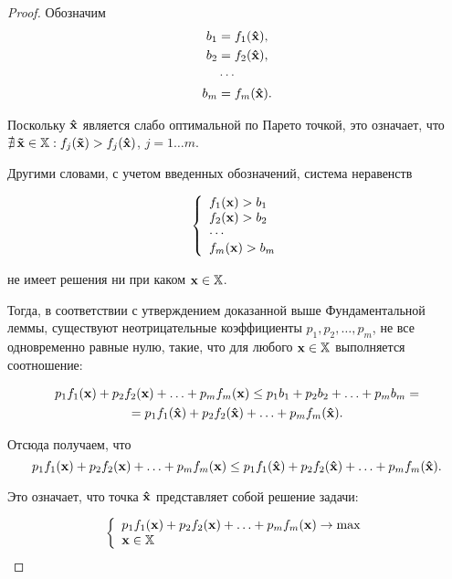 \begin{proof}

Обозначим
\begin{align*}
 b_1 &=f_1(\mathbf{\hat x}),\\
 b_2 &=f_2(\mathbf{\hat x}),\\
  &\cdots \\
 b_m &=f_m(\mathbf{\hat x}).
\end{align*}

Поскольку $\mathbf{\hat x}$ является слабо оптимальной по Парето точкой,
это означает, что $\nexists \, \mathbf{\tilde x} \in \mathbb{X}:
f_j(\mathbf{\tilde x})> f_j(\mathbf{\hat x})$, $j=1 \ldots m$.

Другими словами, с учетом введенных обозначений, система неравенств

\[
\left\{ \begin{array}{l}
 f_1(\mathbf{x}) > b_1\\
 f_2(\mathbf{x}) > b_2 \\
  \cdots  \\
 f_m(\mathbf{x}) > b_m \\
 \end{array} \right.
\]

\noindent не имеет решения ни при каком $\mathbf{x} \in \mathbb{X}$.

Тогда, в соответствии с утверждением доказанной выше Фундаментальной
леммы, существуют неотрицательные коэффициенты $p_1, p_2, \ldots,
p_m$, не все одновременно равные нулю, такие, что для любого $\mathbf{x}
\in \mathbb{X}$ выполняется соотношение:

\begin{multline}
p_1 f_1(\mathbf{x}) + p_2 f_2(\mathbf{x}) + \ldots + p_m f_m(\mathbf{x}) \leq
p_1 b_1 + p_2 b_2 + \ldots + p_m b_m = \\ = p_1 f_1(\mathbf{\hat x}) +
p_2 f_2(\mathbf{\hat x}) + \ldots + p_m f_m(\mathbf{\hat x}).
\end{multline}

\noindent  Отсюда получаем, что
\[p_1 f_1(\mathbf{x}) + p_2 f_2(\mathbf{x}) + \ldots + p_m
f_m(\mathbf{x}) \leq p_1 f_1(\mathbf{\hat x}) + p_2 f_2(\mathbf{\hat x}) +
\ldots + p_m f_m(\mathbf{\hat x}). \]

\noindent Это означает, что точка $\mathbf{\hat x}$ представляет собой
решение задачи:

\[ \left\{
\begin{array}{l}
 p_1 f_1(\mathbf{x}) + p_2 f_2(\mathbf{x}) + \ldots + p_m f_m(\mathbf{x})\to \max  \\
 \mathbf{x} \in \mathbb{X} \\
 \end{array} \right.
\]


\end{proof}




